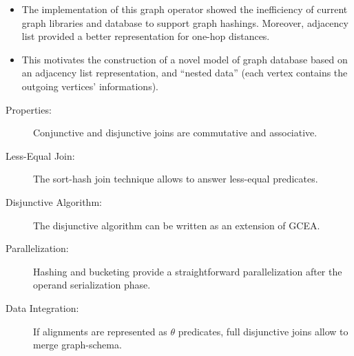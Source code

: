 \begin{lucido}[Results]
	\begin{itemize}
		\item The implementation of this graph operator showed the inefficiency of current graph libraries and database to support graph hashings. Moreover, adjacency list provided a better representation for one-hop distances.
		\item  This motivates the construction of a novel model of graph database based on an adjacency list representation, and ``nested data'' (each vertex contains the outgoing vertices' informations).
	\end{itemize}
\end{lucido}

\begin{lucido}
\begin{description}
	\item[Properties:] Conjunctive and disjunctive joins are commutative and associative.
	\item[Less-Equal Join:] The sort-hash join technique allows to answer less-equal predicates.
	\item[Disjunctive Algorithm:] The disjunctive algorithm can be written as an extension of GCEA.
\end{description}
\end{lucido}

\begin{lucido}
\begin{description}
	\item[Parallelization:] Hashing and bucketing  provide a straightforward parallelization after the operand serialization phase.
	\item[Data Integration:] If alignments are represented as $\theta$ predicates, full disjunctive joins allow to merge graph-schema.
\end{description}
\end{lucido}

